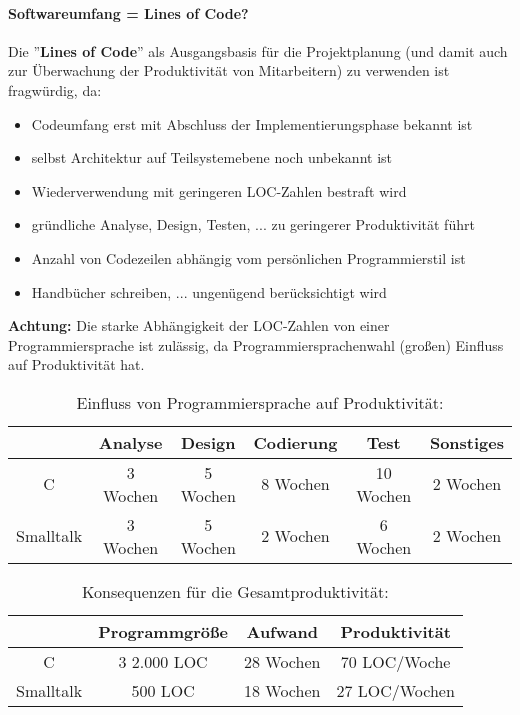 \paragraph{Softwareumfang = Lines of Code?}
Die ''\textbf{Lines of Code}'' als Ausgangsbasis für die Projektplanung (und damit auch zur Überwachung der Produktivität von Mitarbeitern) zu verwenden ist fragwürdig, da:
\begin{itemize}
	\item Codeumfang erst mit Abschluss der Implementierungsphase bekannt ist
	\item selbst Architektur auf Teilsystemebene noch unbekannt ist
	\item Wiederverwendung mit geringeren LOC-Zahlen bestraft wird
	\item gründliche Analyse, Design, Testen, ... zu geringerer Produktivität führt
	\item Anzahl von Codezeilen abhängig vom persönlichen Programmierstil ist
	\item Handbücher schreiben, ... ungenügend berücksichtigt wird
\end{itemize}
\textbf{Achtung:} Die starke Abhängigkeit der LOC-Zahlen von einer Programmiersprache ist zulässig, da Programmiersprachenwahl (großen) Einfluss auf Produktivität hat.

\begin{table}
	\centering
	\begin{tabular}{||c | c | c | c | c | c||} 
		\hline
		  & Analyse & Design & Codierung & Test & Sonstiges \\  
		\hline\hline
		C & 3 Wochen & 5 Wochen & 8 Wochen & 10 Wochen & 2 Wochen \\ 
		\hline
		Smalltalk & 3 Wochen & 5 Wochen & 2 Wochen & 6 Wochen & 2 Wochen \\ 
		\hline
	\end{tabular}
	\caption{Einfluss von Programmiersprache auf Produktivität:}
\end{table}

\begin{table}
	\centering
	\begin{tabular}{||c | c | c | c ||} 
		\hline
		& Programmgröße & Aufwand & Produktivität \\  
		\hline\hline
		C & 3 2.000 LOC & 28 Wochen & 70 LOC/Woche \\ 
		\hline
		Smalltalk & 500 LOC & 18 Wochen & 27 LOC/Wochen \\ 
		\hline
	\end{tabular}
	\caption{Konsequenzen für die Gesamtproduktivität:}
\end{table}

